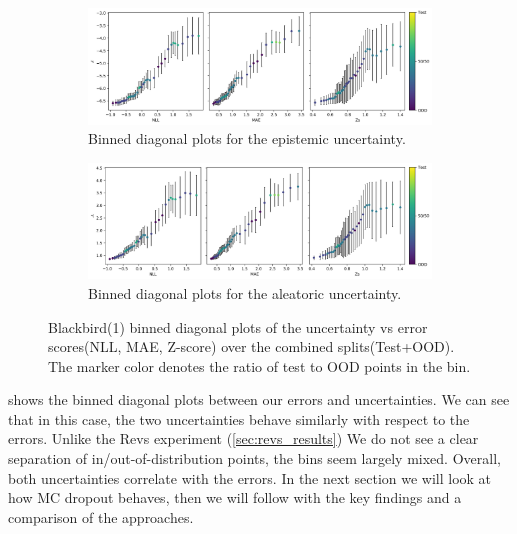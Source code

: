 \begin{figure}[htbp]
  \centering
    \begin{subfigure}[b]{\textwidth}
        \includegraphics[width=\textwidth]{Experiments/figs/binned/bb1_crnn_epistemic.png}
        \caption{Binned diagonal plots for the epistemic uncertainty.}
    \end{subfigure}
    
    \begin{subfigure}[b]{\textwidth}
        \includegraphics[width=\textwidth]{Experiments/figs/binned/bb1_crnn_aleatoric.png}
        \caption{Binned diagonal plots for the aleatoric uncertainty.}
  \end{subfigure}
    \caption[Blackbird(1) error-uncertainty diagonal plots for C-RNN]{Blackbird(1) binned diagonal plots of the  uncertainty vs error scores(NLL, MAE, Z-score) over the combined splits(Test+OOD). The marker color denotes the ratio of test to OOD points in the bin. }
    \label{fig:bb1_uncertainty_corr}
\end{figure}

 shows the binned diagonal plots between our errors and uncertainties. We can see that in this case, the two uncertainties behave similarly with respect to the errors. Unlike the Revs experiment (\cref{sec:revs_results}) We do not see a clear separation of in/out-of-distribution points, the bins seem largely mixed. Overall, both uncertainties correlate with the errors.  
In the next section we will look at how MC dropout behaves, then we will follow with the key findings and a comparison of the approaches.


